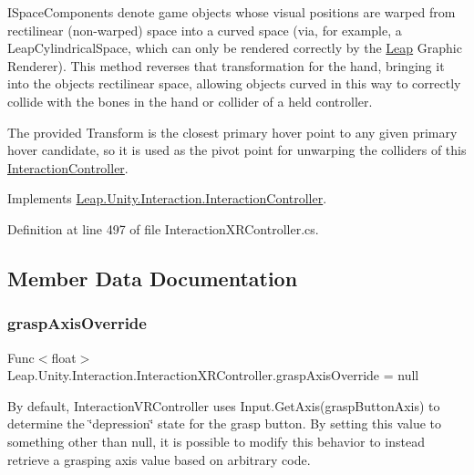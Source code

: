 I\+Space\+Components denote game objects whose visual positions are warped from rectilinear (non-\/warped) space into a curved space (via, for example, a Leap\+Cylindrical\+Space, which can only be rendered correctly by the \mbox{\hyperlink{namespace_leap_1_1_unity_1_1_leap}{Leap}} Graphic Renderer). This method reverses that transformation for the hand, bringing it into the object\textquotesingle{}s rectilinear space, allowing objects curved in this way to correctly collide with the bones in the hand or collider of a held controller.

The provided Transform is the closest primary hover point to any given primary hover candidate, so it is used as the pivot point for unwarping the colliders of this \mbox{\hyperlink{class_leap_1_1_unity_1_1_interaction_1_1_interaction_controller}{Interaction\+Controller}}. 

Implements \mbox{\hyperlink{class_leap_1_1_unity_1_1_interaction_1_1_interaction_controller_aef6aebf580bed0a675b59e1c4a267376}{Leap.\+Unity.\+Interaction.\+Interaction\+Controller}}.



Definition at line 497 of file Interaction\+X\+R\+Controller.\+cs.



\subsection{Member Data Documentation}
\mbox{\label{class_leap_1_1_unity_1_1_interaction_1_1_interaction_x_r_controller_a5c3b54bb8249aacff51aa5e898d95021}} 
\subsubsection{\texorpdfstring{graspAxisOverride}{graspAxisOverride}}
{\footnotesize\ttfamily Func$<$float$>$ Leap.\+Unity.\+Interaction.\+Interaction\+X\+R\+Controller.\+grasp\+Axis\+Override = null}



By default, Interaction\+V\+R\+Controller uses Input.\+Get\+Axis(grasp\+Button\+Axis) to determine the \char`\"{}depression\char`\"{} state for the grasp button. By setting this value to something other than null, it is possible to modify this behavior to instead retrieve a grasping axis value based on arbitrary code. 

